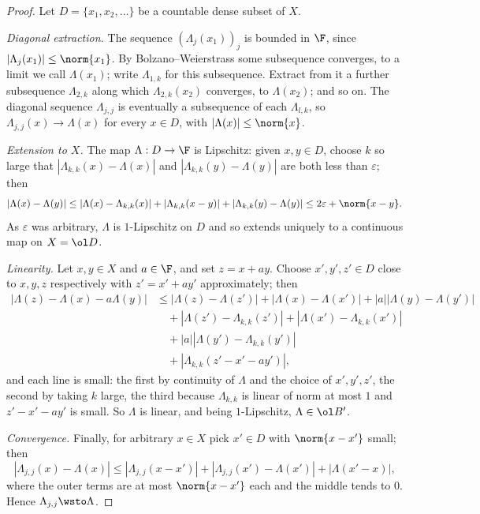 \begin{proof}
	Let $D = \{x_1, x_2, \dots\}$ be a countable dense subset of $X$.

	\emph{Diagonal extraction.} The sequence $(\Lambda_j(x_1))_j$ is bounded in $\F$, since $|\Lambda_j(x_1)| \le \norm{x_1}$. By Bolzano--Weierstrass some subsequence converges, to a limit we call $\Lambda(x_1)$; write $\Lambda_{1,k}$ for this subsequence. Extract from it a further subsequence $\Lambda_{2,k}$ along which $\Lambda_{2,k}(x_2)$ converges, to $\Lambda(x_2)$; and so on. The diagonal sequence $\Lambda_{j,j}$ is eventually a subsequence of each $\Lambda_{l,k}$, so $\Lambda_{j,j}(x) \to \Lambda(x)$ for every $x \in D$, with $|\Lambda(x)| \le \norm{x}$.

	\emph{Extension to $X$.} The map $\Lambda : D \to \F$ is Lipschitz: given $x, y \in D$, choose $k$ so large that $|\Lambda_{k,k}(x)-\Lambda(x)|$ and $|\Lambda_{k,k}(y)-\Lambda(y)|$ are both less than $\varepsilon$; then
	$$|\Lambda(x)-\Lambda(y)| \le |\Lambda(x)-\Lambda_{k,k}(x)| + |\Lambda_{k,k}(x-y)| + |\Lambda_{k,k}(y)-\Lambda(y)| \le 2\varepsilon + \norm{x-y}.$$
	As $\varepsilon$ was arbitrary, $\Lambda$ is $1$-Lipschitz on $D$ and so extends uniquely to a continuous map on $X = \ol D$.

	\emph{Linearity.} Let $x, y \in X$ and $a \in \F$, and set $z = x + ay$. Choose $x', y', z' \in D$ close to $x, y, z$ respectively with $z' = x' + ay'$ approximately; then
	\begin{align*}
		|\Lambda(z) - \Lambda(x)-a\Lambda(y)| &\le |\Lambda(z)-\Lambda(z')| + |\Lambda(x)-\Lambda(x')| + |a| |\Lambda(y)-\Lambda(y')| \\
		&\quad + |\Lambda(z')-\Lambda_{k,k}(z')| + |\Lambda(x')-\Lambda_{k,k}(x')| \\
		&\quad + |a| |\Lambda(y')-\Lambda_{k,k}(y')| \\
		&\quad + |\Lambda_{k,k}(z'-x'-ay')|,
	\end{align*}
	and each line is small: the first by continuity of $\Lambda$ and the choice of $x',y',z'$, the second by taking $k$ large, the third because $\Lambda_{k,k}$ is linear of norm at most $1$ and $z'-x'-ay'$ is small. So $\Lambda$ is linear, and being $1$-Lipschitz, $\Lambda \in \ol B'$.

	\emph{Convergence.} Finally, for arbitrary $x \in X$ pick $x' \in D$ with $\norm{x - x'}$ small; then
	$$|\Lambda_{j,j}(x)-\Lambda(x)| \le |\Lambda_{j,j}(x-x')| + |\Lambda_{j,j}(x')-\Lambda(x')| + |\Lambda(x'-x)|,$$
	where the outer terms are at most $\norm{x-x'}$ each and the middle tends to $0$. Hence $\Lambda_{j,j}\wsto\Lambda$.
\end{proof}

